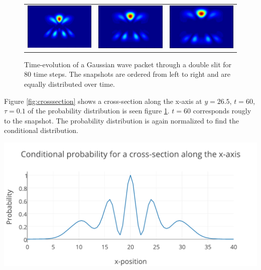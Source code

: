 \begin{figure}[H]
\begin{tabular}{ccc}
  \includegraphics[scale = 0.29]{slit10.png} &   \includegraphics[scale = 0.29]{slit11.png} &   \includegraphics[scale = 0.29]{slit12.png} \\
\end{tabular}
\caption{Time-evolution of a Gaussian wave packet through a double slit for 80 time steps. The snapshots are ordered from left to right and are equally distributed over time.}
\label{fig:doubleslit}

\end{figure} Figure \ref{fig:crosssection} shows a cross-section along the x-axis at $y = 26.5$, $t = 60$, $\tau = 0.1$ of the probability distribution is seen figure \ref{fig:doubleslit}. $t=60$ corresponds rougly to the  snapshot. The probability distribution is again normalized to find the conditional distribution.
\begin{Figure}
    \centerfloat
    \includegraphics[trim = 3.5mm 0mm 3.5mm 0mm, clip,scale = 0.395]{crosssectiondoubleslit.pdf}
    \label{fig:crosssection}
\end{Figure}
